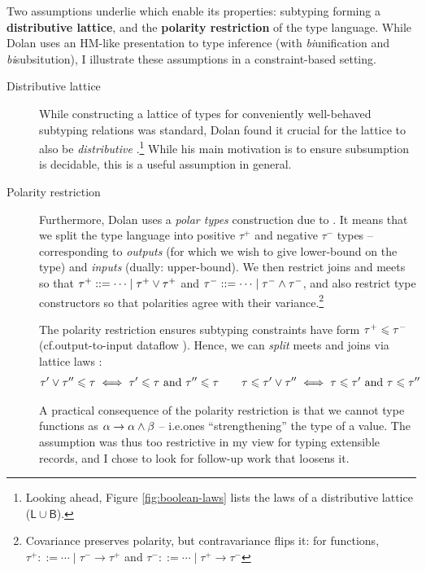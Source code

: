 Two assumptions underlie \mlsub{} which enable its properties: subtyping forming a \textbf{distributive lattice}, and the \textbf{polarity restriction} of the type language. While Dolan uses an HM-like presentation to type inference (with \emph{bi}unification and \emph{bi}subsitution), I illustrate these assumptions in a constraint-based setting. \begin{description}
    \item[Distributive lattice] While constructing a lattice of types for conveniently well-behaved subtyping relations was standard, Dolan found it crucial for the lattice to also be \emph{distributive} \cite[Section~3.2]{dolan-thesis}.\footnote{Looking ahead, Figure \ref{fig:boolean-laws} lists the laws of a distributive lattice ($\mathsf L \cup \mathsf B$).} While his main motivation is to ensure subsumption is decidable, this is a useful assumption in general.
    \item[Polarity restriction] Furthermore, Dolan uses a \emph{polar types} construction due to \textcite{pottier-thesis} \cite[Section~5.1]{dolan-thesis}. It means that we split the type language into positive $\tau^+$ and negative $\tau^-$ types -- corresponding to \emph{outputs} (for which we wish to give lower-bound on the type) and \emph{inputs} (dually: upper-bound). We then restrict joins and meets so that $\tau^+ ::= \cdots \mid \tau^+ \lor \tau^+$ and $\tau^- ::= \cdots \mid \tau^- \land \tau^-$,
    and also restrict type constructors so that polarities agree with their variance.\footnote{Covariance preserves polarity, but contravariance flips it: for functions, $\tau^+ ::= \cdots \mid \tau^- \to \tau^+$ and $\tau^- ::= \cdots \mid \tau^+ \to \tau^-$}
    
    The polarity restriction ensures subtyping constraints have form $\tau^+ \leqslant \tau^-$ (cf.\@ output-to-input dataflow \cite[Section~1.1]{dolan-thesis}). Hence, we can \emph{split} meets and joins via lattice laws \cite{simple-sub}: 
    \begin{align*}
        \tau' \lor \tau'' \leqslant \tau \iff \tau' \leqslant \tau \text{ and } \tau'' \leqslant \tau \qquad
        \tau \leqslant \tau' \lor \tau'' \iff \tau \leqslant \tau' \text{ and } \tau \leqslant \tau''
    \end{align*}

    A practical consequence of the polarity restriction is that we cannot type functions as $\alpha \to \alpha \land \beta$ -- i.e.\@ ones \enquote{strengthening} the type of a value. The assumption was thus too restrictive in my view for typing extensible records, and I chose to look for follow-up work that loosens it. 
\end{description}

